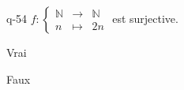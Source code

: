 \begin{truefalse}{q-54}
$f:\left\{\begin{array}{ccc}\mathbb{N} & \to & \mathbb{N} \\n & \mapsto & 2n\end{array}\right.$ est surjective.
\item Vrai
\item* Faux
\end{truefalse}

